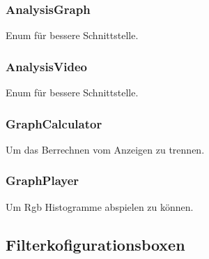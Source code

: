 \documentclass{scrartcl}
\begin{document}
{\subsubsection{AnalysisGraph}
Enum für bessere Schnittstelle.
\subsubsection{AnalysisVideo}
Enum für bessere Schnittstelle.
\subsubsection{GraphCalculator}
Um das Berrechnen vom Anzeigen zu trennen.
\subsubsection{GraphPlayer}
Um Rgb Histogramme abspielen zu können.
\newpage
\subsection{Filterkofigurationsboxen}
}
\end{document}
